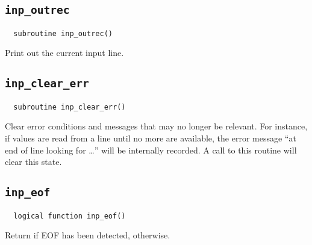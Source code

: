 \subsection{{\tt inp\_outrec}}
\begin{verbatim}
  subroutine inp_outrec()
\end{verbatim}
Print out the current input line.

\subsection{{\tt inp\_clear\_err}}
\begin{verbatim}
  subroutine inp_clear_err()
\end{verbatim}
Clear error conditions and messages that may no longer be relevant.
For instance, if values are read from a line until no more are
available, the error message ``at end of line looking for \ldots''
will be internally recorded.  A call to this routine will clear this state.

\subsection{{\tt inp\_eof}}
\begin{verbatim}
  logical function inp_eof()
\end{verbatim}
Return \TRUE if EOF has been detected, \FALSE otherwise.


